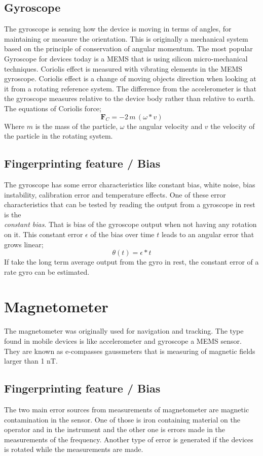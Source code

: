 \subsection{Gyroscope}\label{sec:gyroscope}
The gyroscope is sensing how the device is moving in terms of angles, for maintaining or measure the orientation. This is originally  a mechanical system based on the principle of conservation of angular momentum. The most popular Gyroscope for devices today is a MEMS that is using silicon micro-mechanical techniques. Coriolis effect is measured with vibrating elements in the MEMS gyroscope. Coriolis effect is a change of moving objects direction when looking at it from a rotating reference system. The difference from the accelerometer is that the gyroscope measures relative to the device body rather than relative to earth. The equations of Coriolis force;  
$$\boldsymbol{ F}_C = -2 \, m \, (\omega *  v)$$
Where $m$ is the mass of the particle, $\omega$ the angular velocity and $v$ the velocity of the particle in the rotating system. 
\cite[]{sensor:inertialNav}
\subsection{Fingerprinting feature / Bias}
The gyroscope has some error characteristics like constant bias, white noise, bias instability, calibration error and temperature effects. One of these error characteristics that can be tested by reading the output from a gyroscope in rest is the \\\textit{constant bias}. That is bias of the gyroscope output when not having any rotation on it. This constant error $\epsilon$ of the bias over time $t$ leads to an angular error that grows linear; 
$$\theta (t)= \epsilon * t $$
If take the long term average output from the gyro in rest, the constant error of a rate gyro can be estimated.\cite[]{sensors:fusion}


\section{Magnetometer}
The magnetometer was originally used for navigation and tracking. The type found in mobile devices is like accelerometer and gyroscope a MEMS sensor. They are known as e-compasses gaussmeters that is measuring of magnetic fields larger than 1 nT.
~\cite{sensor:magn}
\subsection{Fingerprinting feature / Bias}
The two main error sources from measurements of magnetometer are magnetic contamination in the sensor. One of those is iron containing material on the operator and in the instrument and the other one is errors made in the measurements of the frequency. Another type of error is generated if the devices is rotated while the measurements are made. \cite[]{sensors:fusion}

